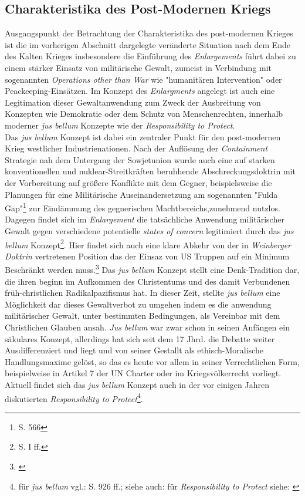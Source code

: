 \documentclass[11pt,a4paper,oneside,numbers=noenddot,bibliography=totocnumbered,DIV=13]{scrartcl}
\begin{document}
\subsection{Charakteristika des Post-Modernen Kriegs}
Ausgangspunkt der Betrachtung der Charakteristika des post-modernen Krieges ist die im vorherigen Abschnitt dargelegte veränderte Situation nach dem Ende des Kalten Krieges insbesondere die Einführung des \textit{Enlargements} führt dabei zu einem stärker Einsatz von militärische Gewalt, zumeist in Verbindung mit sogenannten \textit{Operations other than War} wie "humanitären Intervention" oder Peackeeping-Einsätzen. Im Konzept des \textit{Enlargments} angelegt ist auch eine Legitimation dieser Gewaltanwendung zum Zweck der Ausbreitung von Konzepten wie Demokratie oder dem Schutz von Menschenrechten, innerhalb moderner \textit{jus bellum} Konzepte wie der \textit{Responsibility to Protect}.\\
Das \textit{jus bellum} Konzept ist dabei ein zentraler Punkt für den post-modernen Krieg westlicher Industrienationen. Nach der Auflösung der  \textit{Containment} Strategie nah dem Untergang der Sowjetunion wurde auch eine auf starken konventionellen und nuklear-Streitkräften beruhhende Abschreckungsdoktrin mit der Vorbereitung auf größere Konflikte mit dem Gegner, beispielsweise die Planungen für eine Militärische Auseinandersetzung am sogenannten "Fulda Gap"\footnote{\cite{olson_war_2007}S. 566} zur Eindämmung des gegnerischen Machtbereichs,zunehmend nutzlos. Dagegen findet sich im \textit{Enlargement} die tatsächliche Anwendung militärischer Gewalt gegen verschiedene potentielle \textit{states of concern} legitimiert durch das \textit{jus bellum} Konzept\footnote{\cite{DerDerian2001}S. I ff.}. Hier findet sich auch eine klare Abkehr von der in \textit{Weinberger Doktrin} vertretenen Position das der Einsaz von US Truppen auf ein Minimum Beschränkt werden muss.\footnote{\cite{lafeber_rise_2009}}  
Das \textit{jus bellum} Konzept stellt eine Denk-Tradition dar, die ihren beginn im Aufkommen des Christentums und des damit Verbundenen früh-christlichen Radikalpazifismus hat. In dieser Zeit, stellte \textit{jus bellum} eine Möglichkeit dar dieses Gewaltverbot zu umgehen indem es die anwendung militärischer Gewalt, unter bestimmten Bedingungen, als Vereinbar mit dem Christlichen Glauben ansah. \textit{Jus bellum} war zwar schon in seinen Anfängen ein säkulares Konzept, allerdings hat sich seit dem 17 Jhrd. die Debatte weiter Ausdifferenziert und liegt und von seiner Gestallt als ethisch-Moralische Handlungsmaxime gelöst, so das es heute vor allem in seiner Verrechtlichen Form, beispielweise in Artikel 7 der UN Charter oder im Kriegsvölkerrecht vorliegt. Aktuell findet sich das \textit{jus bellum} Konzept auch in der vor einigen Jahren diskutierten \textit{Responsibility to Protect}\footnote{für \textit{jus bellum} vgl.: \cite{2002} S. 926 ff.; siehe auch: \cite{bellamy_responsibilities_2008} für \textit{Responsibility to Protect} siehe: \cite{international_commission_on_intervention_and_state_sovereignty_responsibility_2001}}.\\
\end{document}
